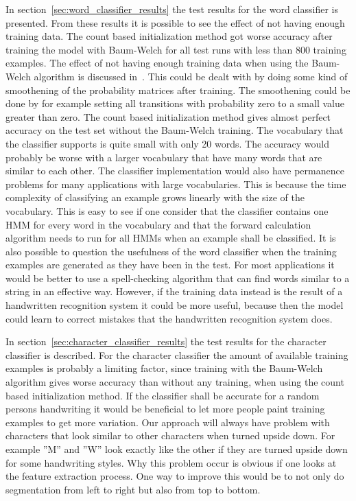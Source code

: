 In section~\ref{sec:word_classifier_results} the test results for the word classifier is presented.
From these results it is possible to see the effect of not having enough training data.
The count based initialization method got worse accuracy after training the model with Baum-Welch for all test runs with less than 800 training examples.
The effect of not having enough training data when using the Baum-Welch algorithm is discussed in~\cite{Rabiner1989}.
This could be dealt with by doing some kind of smoothening of the probability matrices after training.
The smoothening could be done by for example setting all transitions with probability zero to a small value greater than zero.
The count based initialization method gives almost perfect accuracy on the test set without the Baum-Welch training.
The vocabulary that the classifier supports is quite small with only 20 words.
The accuracy would probably be worse with a larger vocabulary that have many words that are similar to each other.
The classifier implementation would also have permanence problems for many applications with large vocabularies.
This is because the time complexity of classifying an example grows linearly with the size of the vocabulary.
This is easy to see if one consider that the classifier contains one HMM for every word in the vocabulary and that the forward calculation algorithm needs to run for all HMMs when an example shall be classified.
It is also possible to question the usefulness of the word classifier when the training examples are generated as they have been in the test.
For most applications it would be better to use a spell-checking algorithm that can find words similar to a string in an effective way.
However, if the training data instead is the result of a handwritten recognition system it could be more useful, because then the model could learn to correct mistakes that the handwritten recognition system does.

In section~\ref{sec:character_classifier_results} the test results for the character classifier is described.
For the character classifier the amount of available training examples is probably a limiting factor, since training with the Baum-Welch algorithm gives worse accuracy than without any training, when using the count based initialization method.
If the classifier shall be accurate for a random persons handwriting it would be beneficial to let more people paint training examples to get more variation.
Our approach will always have problem with characters that look similar to other characters when turned upside down.
For example ''M'' and ''W'' look exactly like the other if they are turned upside down for some handwriting styles.
Why this problem occur is obvious if one looks at the feature extraction process.
One way to improve this would be to not only do segmentation from left to right but also from top to bottom.